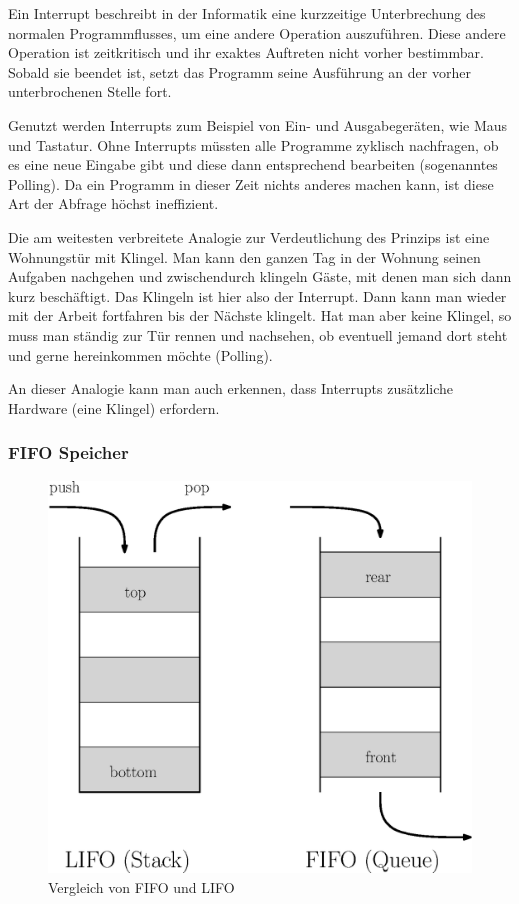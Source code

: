 \documentclass[12pt,a4paper,twoside,BCOR=12.5mm]{scrartcl}
\begin{document}
Ein Interrupt beschreibt in der Informatik eine kurzzeitige Unterbrechung des normalen Programmflusses, um eine andere Operation auszuführen. Diese andere Operation ist zeitkritisch und ihr exaktes Auftreten nicht vorher bestimmbar. Sobald sie beendet ist, setzt das Programm seine Ausführung an der vorher unterbrochenen Stelle fort.

Genutzt werden Interrupts zum Beispiel von Ein- und Ausgabegeräten, wie Maus und Tastatur. Ohne Interrupts müssten alle Programme zyklisch nachfragen, ob es eine neue Eingabe gibt und diese dann entsprechend bearbeiten (sogenanntes Polling). Da ein Programm in dieser Zeit nichts anderes machen kann, ist diese Art der Abfrage höchst ineffizient.

Die am weitesten verbreitete Analogie zur Verdeutlichung des Prinzips ist eine Wohnungstür mit Klingel. Man kann den ganzen Tag in der Wohnung seinen Aufgaben nachgehen und zwischendurch klingeln Gäste, mit denen man sich dann kurz beschäftigt. Das Klingeln ist hier also der Interrupt. Dann kann man wieder mit der Arbeit fortfahren bis der Nächste klingelt. Hat man aber keine Klingel, so muss man ständig zur Tür rennen und nachsehen, ob eventuell jemand dort steht und gerne hereinkommen möchte (Polling).

An dieser Analogie kann man auch erkennen, dass Interrupts zusätzliche Hardware (eine Klingel) erfordern.


\subsubsection{FIFO Speicher}

\begin{figure}[H]
\centering
\includegraphics[scale=.7]{fifolifo.eps}
\caption{Vergleich von FIFO und LIFO}
\label{fifolifo}
\end{figure}
\end{document}
